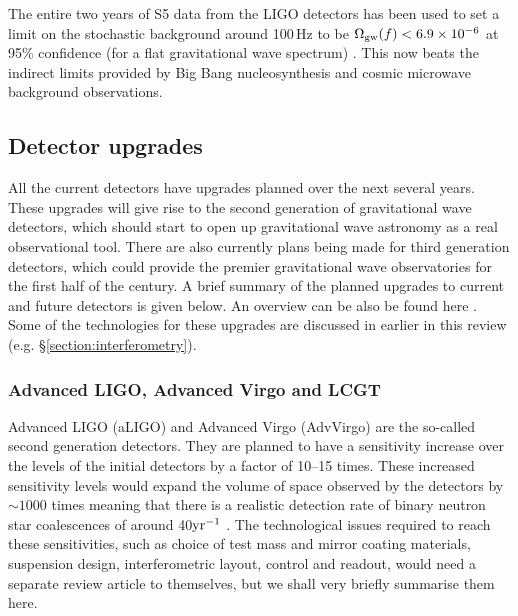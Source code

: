 \documentclass{article}
\begin{document}
The entire two years of S5 data from the LIGO detectors has been used to set a
limit on the stochastic background around 100\,Hz to be $\Omega_{\rm gw}(f) <
6.9\times10^{-6}$ at 95\% confidence (for a flat gravitational wave spectrum)
\cite{Abbott:2009b}. This now beats the indirect limits provided by Big Bang
nucleosynthesis and cosmic microwave background observations.

\subsection{Detector upgrades}
All the current detectors have upgrades planned over the next several years.
These upgrades will give rise to the second generation of gravitational wave
detectors, which should start to open up gravitational wave astronomy as a
real observational tool. There are also currently plans being made for third
generation detectors, which could provide the premier gravitational wave
observatories for the first half of the century. A brief summary of the planned
upgrades to current and future detectors is given below. An overview can be also
be found here \cite{Whitcomb:2008}. Some of the technologies for these upgrades
are discussed in earlier in this review (e.g. \S\ref{section:interferometry}).

\subsubsection{Advanced LIGO, Advanced Virgo and LCGT}\label{subsection:aligo}
Advanced LIGO (aLIGO) \cite{Harry:2010, AdvLIGO, AdvLIGOweb} and Advanced Virgo
(AdvVirgo) \cite{AdvVirgo, AdvVirgoweb} are the so-called second generation
detectors. They are planned to have a sensitivity increase over the levels of
the initial detectors by a factor of 10--15 times. These increased sensitivity
levels would expand the volume of space observed by the detectors by $\sim1000$
times meaning that there is a realistic detection rate of binary neutron star
coalescences of around 40${\rm yr}^{-1}$ \cite{Abadie:2010e, Kopparapu:2008}.
The technological issues required to reach these sensitivities, such as choice
of test mass and mirror coating materials, suspension design, interferometric
layout, control and readout, would need a separate review article to themselves,
but we shall very briefly summarise them here.
\end{document}
